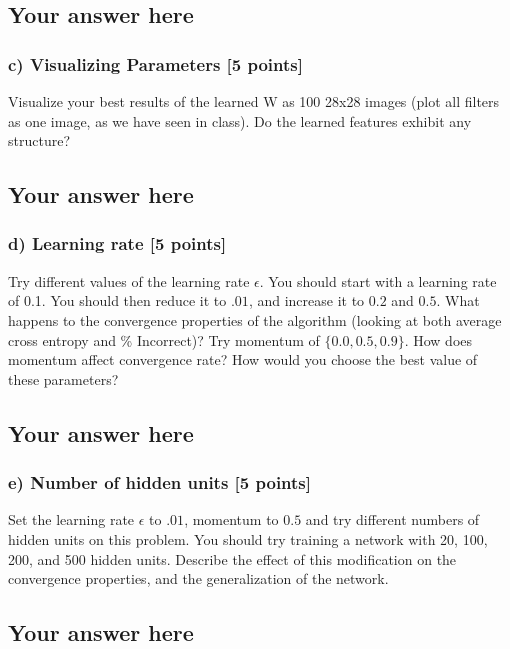 \documentclass{article}
\begin{document}
\subsection*{Your answer here}

\subsubsection*{c) Visualizing Parameters [5 points]}
Visualize your best results of the learned W as 100 28x28 images 
(plot all filters as one image, as we have seen in class). 
Do the learned features exhibit any structure?

\subsection*{Your answer here}

\subsubsection*{d) Learning rate [5 points]}
Try different values of the learning rate $\epsilon$. 
You should start with a learning rate of 0.1. 
You should then reduce it to $.01$, and increase it to $0.2$ and
$0.5$. What happens to the convergence properties of the algorithm (looking at
both average cross entropy and \% Incorrect)? Try momentum of $\{0.0, 0.5, 0.9\}$. How does
momentum affect convergence rate? How would you choose the best value of these
parameters?

\subsection*{Your answer here}

\subsubsection*{e) Number of hidden units [5 points]}
Set the learning rate $\epsilon$ to $.01$, momentum to $0.5$ and try different numbers of
hidden units on this problem.
You should try training a network with 20, 100, 200, and 500  hidden units.
Describe the effect of this modification on the convergence properties, and the
generalization of the network.

\subsection*{Your answer here}
\end{document}
